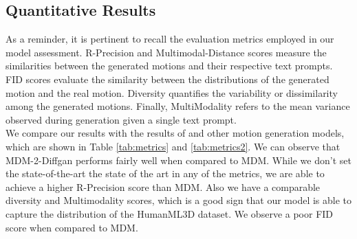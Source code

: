 \documentclass[10pt,twocolumn,letterpaper]{article}
\begin{document}
\subsection{Quantitative Results}

As a reminder, it is pertinent to recall the evaluation metrics employed in our model assessment. R-Precision and Multimodal-Distance scores measure the similarities 
between the generated motions and their respective text prompts. FID scores evaluate the similarity between the distributions of the generated motion and the real 
motion. Diversity quantifies the variability or dissimilarity among the generated motions. Finally, MultiModality refers to the mean variance observed during 
generation given a single text prompt.
\\

We compare our results with the results of \cite{Tevet23} and other motion generation models, which are shown in Table \ref{tab:metrics} 
and \ref{tab:metrics2}. We can observe that MDM-2-Diffgan performs fairly well when compared to MDM. While we don't set the state-of-the-art
the state of the art in any of the metrics, we are able to achieve a higher R-Precision score than MDM. Also we have a comparable diversity and Multimodality
scores, which is a good sign that our model is able to capture the distribution of the HumanML3D dataset. We observe a poor FID score when
compared to MDM. 
\end{document}
